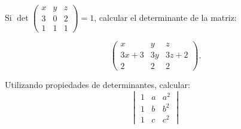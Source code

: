 \documentclass[compacto,10pt]{pubciencias-notas}
\begin{document}

\begin{ejer}
    Si $\det
        \begin{pmatrix}
            x&y&z\\
            3&0&2\\
            1&1&1
        \end{pmatrix}
    =1$, calcular el determinante de la matriz:
    
    \[
        \begin{pmatrix}
            x & y & z \\
            3x+3 & 3y & 3z+2 \\
            2 & 2 & 2
        \end{pmatrix}.
    \]
\end{ejer}

\begin{ejer}
  Utilizando propiedades de determinantes, calcular:
   \[
    \begin{vmatrix}
            1 & a & a^2 \\
            1 & b & b^2 \\
            1 & c & c^2
        \end{vmatrix}
    \]
\end{ejer}
\end{document}
